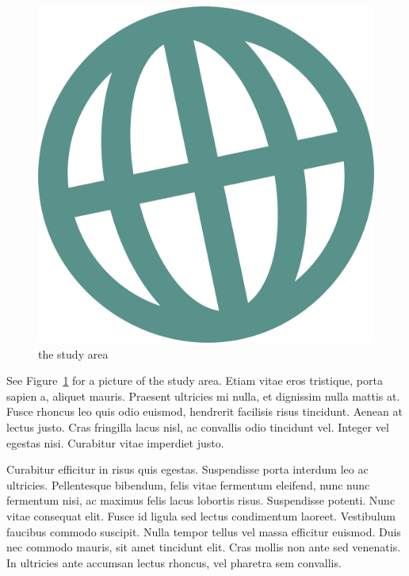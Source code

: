 \documentclass[
  oneside,
  open=any]{scrbook}
\begin{document}
\begin{figure}

{\centering \includegraphics{logo.png}

}

\caption{\label{fig-logo}the study area}

\end{figure}

See Figure~\ref{fig-logo} for a picture of the study area. Etiam vitae
eros tristique, porta sapien a, aliquet mauris. Praesent ultricies mi
nulla, et dignissim nulla mattis at. Fusce rhoncus leo quis odio
euismod, hendrerit facilisis risus tincidunt. Aenean at lectus justo.
Cras fringilla lacus nisl, ac convallis odio tincidunt vel. Integer vel
egestas nisi. Curabitur vitae imperdiet justo.

Curabitur efficitur in risus quis egestas. Suspendisse porta interdum
leo ac ultricies. Pellentesque bibendum, felis vitae fermentum eleifend,
nunc nunc fermentum nisi, ac maximus felis lacus lobortis risus.
Suspendisse potenti. Nunc vitae consequat elit. Fusce id ligula sed
lectus condimentum laoreet. Vestibulum faucibus commodo suscipit. Nulla
tempor tellus vel massa efficitur euismod. Duis nec commodo mauris, sit
amet tincidunt elit. Cras mollis non ante sed venenatis. In ultricies
ante accumsan lectus rhoncus, vel pharetra sem convallis.
\end{document}
